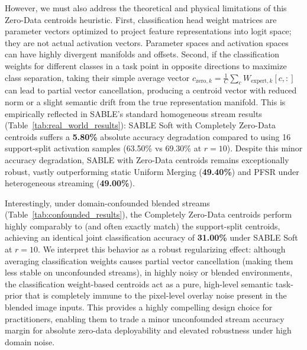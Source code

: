 However, we must also address the theoretical and physical limitations of this Zero-Data centroids heuristic. First, classification head weight matrices are parameter vectors optimized to project feature representations into logit space; they are not actual activation vectors. Parameter spaces and activation spaces can have highly divergent manifolds and offsets. Second, if the classification weights for different classes in a task point in opposite directions to maximize class separation, taking their simple average vector $c_{\text{zero}, k} = \frac{1}{C}\sum_c W_{\text{expert}, k}[c, :]$ can lead to partial vector cancellation, producing a centroid vector with reduced norm or a slight semantic drift from the true representation manifold. This is empirically reflected in SABLE's standard homogeneous stream results (Table~\ref{tab:real_world_results}): SABLE Soft with Completely Zero-Data centroids suffers a \textbf{5.80\%} absolute accuracy degradation compared to using 16 support-split activation samples (63.50\% vs 69.30\% at $r=10$). Despite this minor accuracy degradation, SABLE with Zero-Data centroids remains exceptionally robust, vastly outperforming static Uniform Merging (\textbf{49.40\%}) and PFSR under heterogeneous streaming (\textbf{49.00\%}). 

Interestingly, under domain-confounded blended streams (Table~\ref{tab:confounded_results}), the Completely Zero-Data centroids perform highly comparably to (and often exactly match) the support-split centroids, achieving an identical joint classification accuracy of \textbf{31.00\%} under SABLE Soft at $r=10$. We interpret this behavior as a robust regularizing effect: although averaging classification weights causes partial vector cancellation (making them less stable on unconfounded streams), in highly noisy or blended environments, the classification weight-based centroids act as a pure, high-level semantic task-prior that is completely immune to the pixel-level overlay noise present in the blended image inputs. This provides a highly compelling design choice for practitioners, enabling them to trade a minor unconfounded stream accuracy margin for absolute zero-data deployability and elevated robustness under high domain noise.

